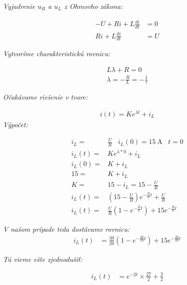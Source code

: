 \textit{Vyjadrenie $u_R$ a $u_L$ z Ohmovho zákona:}

\begin{equation*}
\begin{aligned}
-U+Ri+L\frac{di}{dt}&=0 \\
Ri+L\frac{di}{dt}&=U
\end{aligned}
\end{equation*}

\textit{Vytvoríme charakteristickú rovnicu:}

\begin{equation*}
\begin{aligned}
L\lambda+R=0 \\
\lambda=-\frac{R}{L}=-\frac{1}{\tau}
\end{aligned}
\end{equation*}

\textit{Očakávame riešenie v tvare:}

\begin{equation*}
\begin{aligned}
i(t) = Ke^{\lambda t}+i_L
\end{aligned}
\end{equation*}
\clearpage
\textit{Výpočet:}

\begin{equation*}
\begin{aligned}
i_L =& \frac{U}{R} \; \; \;i_L(0) = \SI{15}{\ampere}\; \; \;t=0 \\
i_L(t) =& Ke^{\lambda*0}+i_L\\
i_L(0)=&K+i_L \\
15=&K+i_L \\
K=&15-i_L=15-\frac{U}{R} \\
i_L(t)=&(15-\frac{U}{R})e^{-\frac{R}{L}t}+\frac{U}{R} \\
i_L(t)=&\frac{U}{R}(1-e^{-\frac{R}{L}t})+15e^{-\frac{R}{L}t}
\end{aligned}
\end{equation*}

\textit{V našom prípade teda dostávame rovnicu:}
\begin{equation*}
\begin{aligned}
i_L(t)&=\frac{30}{20}(1-e^{-\frac{20}{10}t})+15e^{-\frac{20}{10}t}
\end{aligned}
\end{equation*}

\textit{Tú vieme ešte zjednodušiť:}

\begin{equation*}
\begin{aligned}
i_L(t)&=e^{-2t}\times \frac{27}{2} + \frac{3}{2}
\end{aligned}
\end{equation*}




